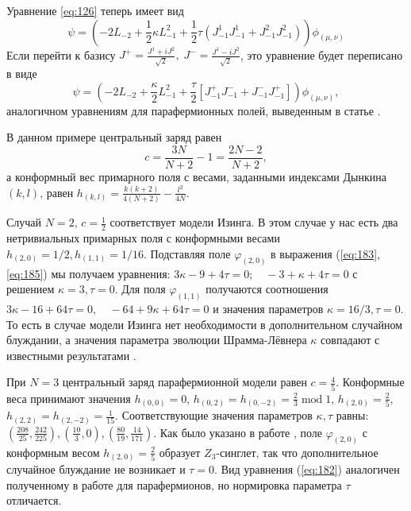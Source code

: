 Уравнение \eqref{eq:126} теперь имеет вид
\begin{equation}
  \label{eq:138}
  \psi=\left(-2L_{-2}+\frac{1}{2}\kappa L_{-1}^{2}+\frac{1}{2}\tau \left(J^{1}_{-1}J^{1}_{-1}+J^{2}_{-1}J^{2}_{-1}\right)\right) \phi_{(\mu,\nu)}
\end{equation}
Если перейти к базису $J^{+}=\frac{J^{1}+iJ^{2}}{\sqrt{2}},\; J^{-}=\frac{J^{1}-iJ^{2}}{\sqrt{2}}$, это уравнение будет переписано в виде
\begin{equation}
 \psi= \left(-2 L_{-2}+\frac{\kappa}{2}L_{-1}^{2}+\frac{\tau}{2}\left[J^{+}_{-1}J^{-}_{-1}+J^{-}_{-1}J^{+}_{-1}\right]\right) \phi_{(\mu,\nu)},
\label{eq:140}
\end{equation}
аналогичном уравнениям для парафермионных полей, выведенным в статье  \cite{santachiara2008sle}.

В данном примере центральный заряд равен
\begin{equation}
  \label{eq:160}
  c=\frac{3N}{N+2}-1=\frac{2N-2}{N+2},
\end{equation}
а конформный вес примарного поля с весами, заданными индексами Дынкина $(k,l)$,  равен $h_{(k,l)}=\frac{k(k+2)}{4(N+2)}-\frac{l^{2}}{4N}$.

Случай  $N=2$, $c=\frac{1}{2}$ соответствует модели Изинга. В этом случае у нас есть два нетривиальных примарных поля с конформными весами $h_{(2,0)}=1/2, h_{(1,1)}=1/16$. Подставляя поле $\varphi_{(2,0)}$ в выражения (\ref{eq:183},\ref{eq:185}) мы получаем уравнения: $3\kappa-9+4\tau =0;\quad -3+\kappa+4\tau=0$ с решением $\kappa=3, \tau=0$. Для поля  $\varphi_{(1,1)}$ получаются соотношения $3\kappa-16+64\tau=0,\quad -64+9\kappa + 64\tau=0$ и значения параметров $\kappa=16/3, \tau=0$. То есть в случае модели Изинга нет необходимости в дополнительном случайном блуждании, а значения параметра эволюции Шрамма-Лёвнера $\kappa$ совпадают с известными результатами \cite{schramm2006conformally}.

При  $N=3$ центральный заряд парафермионной модели равен $c=\frac{4}{5}$. Конформные веса принимают значения $h_{(0,0)}=0$, $h_{(0,2)}=h_{(0,-2)}=\frac{2}{3}\; \mathrm{mod}\; 1$, $h_{(2,0)}=\frac{2}{5}$, $h_{(2,2)}=h_{(2,-2)}=\frac{1}{15}$.  Соответствующие значения параметров  $\kappa,\tau$ равны: $(\frac{208}{25},\frac{242}{225}), (\frac{10}{3},0),(\frac{80}{19},\frac{14}{171})$. Как было указано в работе \cite{santachiara2008sle}, поле  $\varphi_{(2,0)}$ с конформным весом  $h_{(2,0)}=\frac{2}{5}$ образует  $Z_{3}$-синглет, так что дополнительное случайное блуждание не возникает и  $\tau=0$. Вид уравнения (\ref{eq:182}) аналогичен полученному в работе \cite{santachiara2008sle} для парафермионов, но нормировка параметра $\tau$ отличается.

